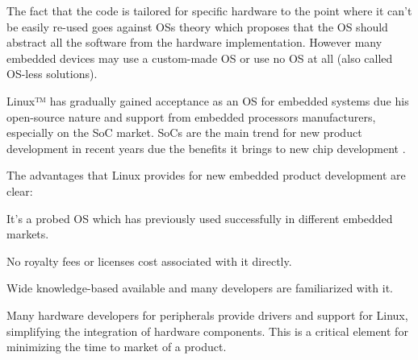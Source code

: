 The fact that the code is tailored for specific hardware to the point where it can't be easily re-used goes against \acp{OS} theory which proposes that the \ac{OS} should abstract all the software from the hardware implementation. However many embedded devices may use a custom-made \ac{OS} or use no \ac{OS} at all (also called \ac{OS}-less solutions).

Linux™ has gradually gained acceptance as an \ac{OS} for embedded systems due his open-source nature and support from embedded processors manufacturers, especially on the \ac{SoC} market. \acp{SoC} are the main trend for new product development in recent years due the benefits it brings to new chip development \cite{Somaya:2000fk}.

The advantages that Linux provides for new embedded product development are clear:
\begin{itemize*}
\item It's a probed \ac{OS} which has previously used successfully in different embedded markets.
\item No royalty fees or licenses cost associated with it directly.
\item Wide knowledge-based available and many developers are familiarized with it.
\item Many hardware developers for peripherals provide drivers and support for Linux, simplifying the integration of hardware components. This is a critical element for minimizing the time to market of a product.
\end{itemize*}


